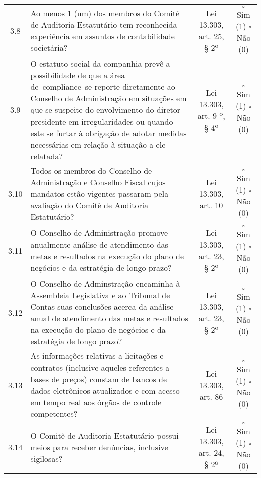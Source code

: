 \begin{center}
\begin{longtable}{c l c c}
3.8 &\parbox[t]{8cm}{Ao menos 1 (um) dos membros do Comitê de Auditoria Estatutário tem reconhecida experiência em assuntos de contabilidade societária?} & \parbox[t]{2cm}{Lei 13.303, art. 25, § 2º} & \parbox[t]{2cm}{$\square$ Sim (1) \\ $\square$ Não (0)}\\

3.9 &\parbox[t]{8cm}{O estatuto social da companhia prevê a possibilidade de que a área de compliance se reporte diretamente ao Conselho de Administração em situações em que se suspeite do envolvimento do diretor-presidente em irregularidades ou quando este se furtar à obrigação de adotar medidas necessárias em relação à situação a ele relatada?} & \parbox[t]{2cm}{Lei 13.303, art. 9 º, § 4º} & \parbox[t]{2cm}{$\square$ Sim (1) \\ $\square$ Não (0)}\\

3.10 &\parbox[t]{8cm}{Todos os membros do Conselho de Administração e Conselho Fiscal cujos mandatos estão vigentes passaram pela avaliação do Comitê de Auditoria Estatutário?} & \parbox[t]{2cm}{Lei 13.303, art. 10} & \parbox[t]{2cm}{$\square$ Sim (1) \\ $\square$ Não (0)}\\

3.11 &\parbox[t]{8cm}{O Conselho de Administração promove anualmente análise de atendimento das metas e resultados na execução do plano de negócios e da estratégia de longo prazo?} & \parbox[t]{2cm}{Lei 13.303, art. 23, § 2º} & \parbox[t]{2cm}{$\square$ Sim (1) \\ $\square$ Não (0)}\\

3.12 &\parbox[t]{8cm}{O Conselho de Adminstração encaminha à Assembleia Legislativa e ao Tribunal de Contas suas conclusões acerca da análise anual de atendimento das metas e resultados na execução do plano de negócios e da estratégia de longo prazo?} & \parbox[t]{2cm}{Lei 13.303, art. 23, § 2º} & \parbox[t]{2cm}{$\square$ Sim (1) \\ $\square$ Não (0)}\\

3.13 &\parbox[t]{8cm}{As informações relativas a licitações e contratos (inclusive aqueles referentes a bases de preços) constam de bancos de dados eletrônicos atualizados e com acesso em tempo real aos órgãos de controle competentes?} & \parbox[t]{2cm}{Lei 13.303, art. 86} & \parbox[t]{2cm}{$\square$ Sim (1) \\ $\square$ Não (0)}\\

3.14 &\parbox[t]{8cm}{O Comitê de Auditoria Estatutário possui meios para receber denúncias, inclusive sigilosas?} & \parbox[t]{2cm}{Lei 13.303, art. 24, § 2º} & \parbox[t]{2cm}{$\square$ Sim (1) \\ $\square$ Não (0)}\\

\end{longtable}
\end{center}
\pagebreak

